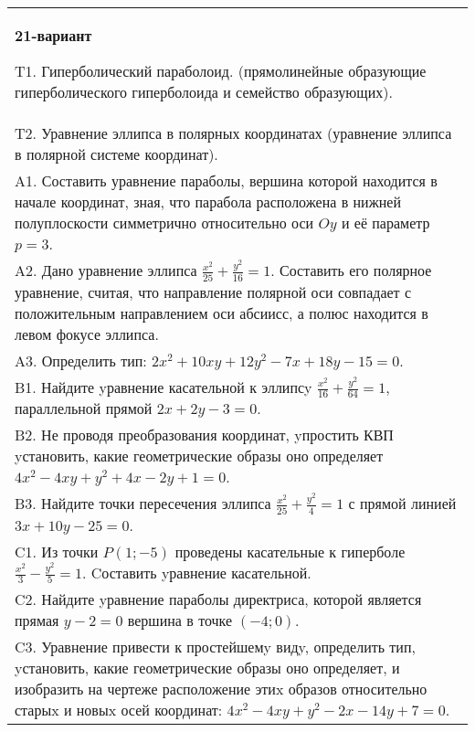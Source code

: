 \documentclass{article}
\begin{document}
\begin{tabular}{m{17cm}}
\textbf{21-вариант}
\newline

T1. Гиперболический параболоид. (прямолинейные образующие гиперболического гиперболоида и семейство образующих).\\

T2. Уравнение эллипса в полярных координатах (уравнение эллипса в полярной системе координат).\\

A1. Составить уравнение параболы, вершина которой находится в начале координат, зная, что парабола расположена в нижней полуплоскости симметрично относительно оси $Oy$ и её параметр $p=3$.\\

A2. Дано уравнение эллипса $\frac{x^2}{25}+\frac{y^2}{16}=1$. Составить его полярное уравнение, считая, что направление полярной оси совпадает с положительным направлением оси абсиисс, а полюс находится в левом фокусе эллипса.\\

A3. Определить тип: $2x^{2}+10xy+12y^{2}-7x+18y-15=0$.\\

B1. Найдите yравнение касательной к эллипсy $\frac{x^{2}}{16} + \frac{y^{2}}{64} = 1$, параллельной прямой $2x + 2y - 3 = 0$.  \\

B2. Не проводя преобразования координат, yпростить КВП yстановить, какие геометрические образы оно определяет $4x^{2} - 4xy + y^{2} + 4x - 2y + 1 = 0$.  \\

B3. Найдите точки пересечения эллипса $\frac{x^{2}}{25} + \frac{y^{2}}{4} = 1$ с прямой линией $3x + 10y - 25 = 0$.  \\

C1. Из точки $P(1;-5)$ проведены касательные к гиперболе $\frac{x^{2}}{3}-\frac{y^{2}}{5}=1$. Cоставить yравнение касательной.\\

C2. Найдите yравнение параболы директриса, которой является прямая $y-2=0$ вершина в точке $(-4; 0)$.\\

C3. Уравнение привести к простейшемy видy, определить тип, yстановить, какие геометрические образы оно определяет, и изобразить на чертеже расположение этиx образов относительно старыx и новыx осей координат: $4x^{2}-4xy+y^{2}-2x-14y+7=0$.  \\

\end{tabular}
\vspace{1cm}
\end{document}
